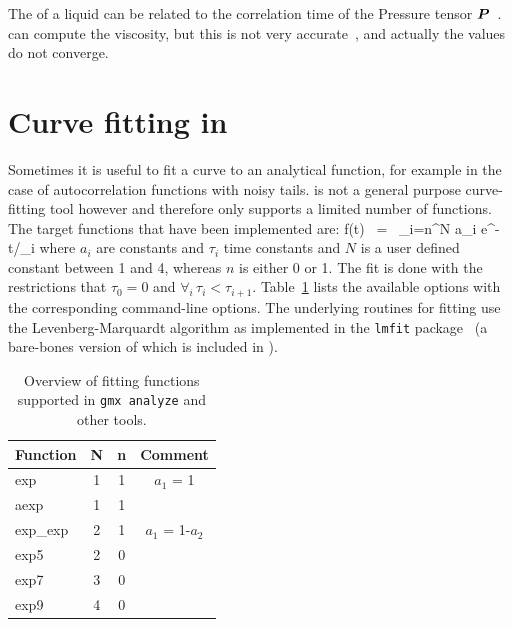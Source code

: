 The  of a liquid can be related to the correlation 
time of the Pressure tensor $\mbox{\boldmath ${P}$}$~\cite{PSmith93c,Balasubramanian96}.
{\tt {}} can compute the viscosity,
but this is not very accurate~\cite{Hess2002a}, and 
actually the values do not converge.

\section{Curve fitting in \gromacs}
Sometimes it is useful to fit a curve to an analytical function, for
example in the case of autocorrelation functions with noisy
tails. {\gromacs} is not a general purpose curve-fitting tool however
and therefore {\gromacs} only supports a limited number of
functions. The target functions that have been implemented are:
\beq
f(t) ~=~ \sum_{i=n}^N a_i {\rm e}^{-t/\tau_i}
\eeq
where $a_i$ are constants and $\tau_i$ time constants and $N$ is a
user defined constant between 1 and 4, whereas $n$ is either 0 or
1. The fit is done with the restrictions that $\tau_0 = 0$ and $\forall_i \,\tau_i < \tau_{i+1}$.
Table~\ref{tab:fitfn} lists the available options with the
corresponding command-line options. The underlying routines for
fitting use the Levenberg-Marquardt algorithm as implemented in the
{\tt lmfit} package~\cite{lmfit} (a bare-bones version of which is
included in {\gromacs}).
\begin{table}[ht]
\centering
\caption{Overview of fitting functions supported in {\tt gmx analyze}
  and other tools.}
\label{tab:fitfn}
\begin{tabular}{lccc}
\hline
Function & N & n & Comment\\
\hline
exp        & 1 & 1 & $a_1$ = 1 \\
aexp      & 1 & 1 & \\
exp_exp & 2 & 1 & $a_1$ = 1-$a_2$\\
exp5      & 2 & 0 & \\
exp7     & 3 & 0 & \\
exp9    & 4 & 0 & \\
\hline
\end{tabular}
\end{table}
